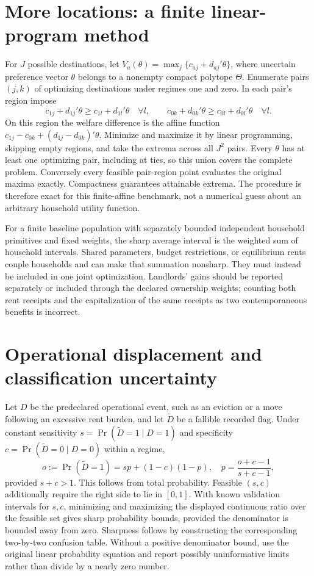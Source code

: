 \documentclass[11pt,a4paper]{article}
\begin{document}
\section{More locations: a finite linear-program method}
For $J$ possible destinations, let
$V_a(\theta)=\max_j\{c_{aj}+d_{aj}'\theta\}$, where uncertain preference vector $\theta$ belongs to a nonempty compact polytope $\Theta$. Enumerate pairs $(j,k)$ of optimizing destinations under regimes one and zero. In each pair's region impose
\[
 c_{1j}+d_{1j}'\theta\ge c_{1l}+d_{1l}'\theta\quad\forall l,
 \qquad
 c_{0k}+d_{0k}'\theta\ge c_{0l}+d_{0l}'\theta\quad\forall l.
\]
On this region the welfare difference is the affine function
$c_{1j}-c_{0k}+(d_{1j}-d_{0k})'\theta$. Minimize and maximize it by linear programming, skipping empty regions, and take the extrema across all $J^2$ pairs. Every $\theta$ has at least one optimizing pair, including at ties, so this union covers the complete problem. Conversely every feasible pair-region point evaluates the original maxima exactly. Compactness guarantees attainable extrema. The procedure is therefore exact for this finite-affine benchmark, not a numerical guess about an arbitrary household utility function.

For a finite baseline population with separately bounded independent household primitives and fixed weights, the sharp average interval is the weighted sum of household intervals. Shared parameters, budget restrictions, or equilibrium rents couple households and can make that summation nonsharp. They must instead be included in one joint optimization. Landlords' gains should be reported separately or included through the declared ownership weights; counting both rent receipts and the capitalization of the same receipts as two contemporaneous benefits is incorrect.

\section{Operational displacement and classification uncertainty}
Let $D$ be the predeclared operational event, such as an eviction or a move following an excessive rent burden, and let $\widetilde D$ be a fallible recorded flag. Under constant sensitivity $s=\Pr(\widetilde D=1\mid D=1)$ and specificity $c=\Pr(\widetilde D=0\mid D=0)$ within a regime,
\[
 o:=\Pr(\widetilde D=1)=s p+(1-c)(1-p),\quad
 p=\frac{o+c-1}{s+c-1}, \tag{3}
\]
provided $s+c>1$. This follows from total probability. Feasible $(s,c)$ additionally require the right side to lie in $[0,1]$. With known validation intervals for $s,c$, minimizing and maximizing the displayed continuous ratio over the feasible set gives sharp probability bounds, provided the denominator is bounded away from zero. Sharpness follows by constructing the corresponding two-by-two confusion table. Without a positive denominator bound, use the original linear probability equation and report possibly uninformative limits rather than divide by a nearly zero number.
\end{document}
